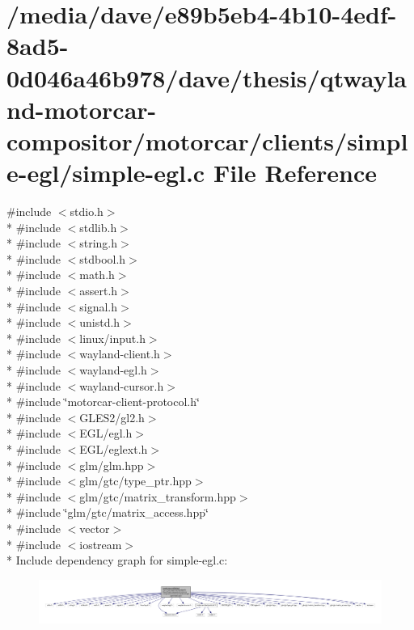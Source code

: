 \hypertarget{simple-egl_8c}{\section{/media/dave/e89b5eb4-\/4b10-\/4edf-\/8ad5-\/0d046a46b978/dave/thesis/qtwayland-\/motorcar-\/compositor/motorcar/clients/simple-\/egl/simple-\/egl.c File Reference}
\label{simple-egl_8c}
}
{\ttfamily \#include $<$stdio.\-h$>$}\\*
{\ttfamily \#include $<$stdlib.\-h$>$}\\*
{\ttfamily \#include $<$string.\-h$>$}\\*
{\ttfamily \#include $<$stdbool.\-h$>$}\\*
{\ttfamily \#include $<$math.\-h$>$}\\*
{\ttfamily \#include $<$assert.\-h$>$}\\*
{\ttfamily \#include $<$signal.\-h$>$}\\*
{\ttfamily \#include $<$unistd.\-h$>$}\\*
{\ttfamily \#include $<$linux/input.\-h$>$}\\*
{\ttfamily \#include $<$wayland-\/client.\-h$>$}\\*
{\ttfamily \#include $<$wayland-\/egl.\-h$>$}\\*
{\ttfamily \#include $<$wayland-\/cursor.\-h$>$}\\*
{\ttfamily \#include \char`\"{}motorcar-\/client-\/protocol.\-h\char`\"{}}\\*
{\ttfamily \#include $<$G\-L\-E\-S2/gl2.\-h$>$}\\*
{\ttfamily \#include $<$E\-G\-L/egl.\-h$>$}\\*
{\ttfamily \#include $<$E\-G\-L/eglext.\-h$>$}\\*
{\ttfamily \#include $<$glm/glm.\-hpp$>$}\\*
{\ttfamily \#include $<$glm/gtc/type\-\_\-ptr.\-hpp$>$}\\*
{\ttfamily \#include $<$glm/gtc/matrix\-\_\-transform.\-hpp$>$}\\*
{\ttfamily \#include \char`\"{}glm/gtc/matrix\-\_\-access.\-hpp\char`\"{}}\\*
{\ttfamily \#include $<$vector$>$}\\*
{\ttfamily \#include $<$iostream$>$}\\*
Include dependency graph for simple-\/egl.c\-:\nopagebreak
\begin{figure}[H]
\begin{center}
\leavevmode
\includegraphics[width=350pt]{simple-egl_8c__incl}
\end{center}
\end{figure}
